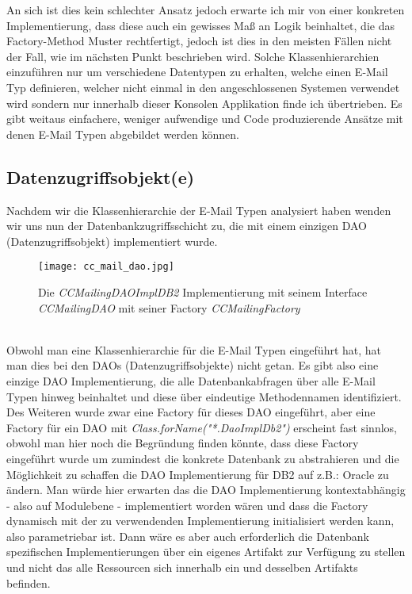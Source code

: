 An sich ist dies kein schlechter Ansatz jedoch erwarte ich mir von einer konkreten Implementierung, dass diese auch ein gewisses Maß an Logik beinhaltet, die das Factory-Method Muster rechtfertigt, jedoch ist dies in den meisten Fällen nicht der Fall, wie im nächsten Punkt beschrieben wird. Solche Klassenhierarchien einzuführen nur um verschiedene Datentypen zu erhalten, welche einen E-Mail Typ definieren, welcher nicht einmal in den angeschlossenen Systemen verwendet wird sondern nur innerhalb dieser Konsolen Applikation finde ich übertrieben. Es gibt weitaus einfachere, weniger aufwendige und Code produzierende Ansätze mit denen E-Mail Typen abgebildet werden können.

\newpage
\subsection{Datenzugriffsobjekt(e)}
Nachdem wir die Klassenhierarchie der E-Mail Typen analysiert haben wenden wir uns nun der Datenbankzugriffsschicht zu, die mit einem einzigen DAO (Datenzugriffsobjekt) implementiert wurde.
\begin{figure}[h]
\centering
\texttt{[image: cc\_mail\_dao.jpg]} 
\caption{Die \emph{CCMailingDAOImplDB2} Implementierung mit seinem Interface \emph{CCMailingDAO} mit seiner Factory \emph{CCMailingFactory}}
\label{fig:class-hierarchie-email}
\end{figure}
\ \\
Obwohl man eine Klassenhierarchie für die E-Mail Typen eingeführt hat, hat man dies bei den DAOs (Datenzugriffsobjekte) nicht getan. Es gibt also eine einzige DAO Implementierung, die alle Datenbankabfragen über alle E-Mail Typen hinweg beinhaltet und diese über eindeutige Methodennamen identifiziert. Des Weiteren wurde zwar eine Factory für dieses DAO eingeführt, aber eine Factory für ein DAO mit \emph{Class.forName("*.DaoImplDb2")} erscheint fast sinnlos, obwohl man hier noch die Begründung finden könnte, dass diese Factory eingeführt wurde um zumindest die konkrete Datenbank zu abstrahieren und die Möglichkeit zu schaffen die DAO Implementierung für DB2 auf z.B.: Oracle zu ändern. Man würde hier erwarten das die DAO Implementierung kontextabhängig - also auf Modulebene - implementiert worden wären und dass die Factory dynamisch mit der zu verwendenden Implementierung initialisiert werden kann, also parametriebar ist. Dann wäre es aber auch erforderlich die Datenbank spezifischen Implementierungen über ein eigenes Artifakt zur Verfügung zu stellen und nicht das alle Ressourcen sich innerhalb ein und desselben Artifakts befinden.

